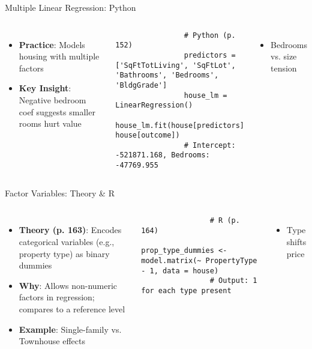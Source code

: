 \documentclass{beamer}
\begin{document}
	\begin{frame}[fragile]{Multiple Linear Regression: Python}
		\lstset{language=Python}
		\begin{columns}
			\begin{itemize}
				\item \textbf{Practice}: Models housing with multiple factors
				\item \textbf{Key Insight}: Negative bedroom coef suggests smaller rooms hurt value
			\end{itemize}
			\begin{lstlisting}
				# Python (p. 152)
				predictors = ['SqFtTotLiving', 'SqFtLot', 'Bathrooms', 'Bedrooms', 'BldgGrade']
				house_lm = LinearRegression()
				house_lm.fit(house[predictors], house[outcome])
				# Intercept: -521871.168, Bedrooms: -47769.955
			\end{lstlisting}
			\begin{itemize}
				\item Bedrooms vs. size tension
			\end{itemize}
		\end{columns}
	\end{frame}
	
	\begin{frame}[fragile]{Factor Variables: Theory \& R}
		\begin{columns}
			\column{0.6\textwidth}
			\begin{itemize}
				\item \textbf{Theory (p. 163)}: Encodes categorical variables (e.g., property type) as binary dummies
				\item \textbf{Why}: Allows non-numeric factors in regression; compares to a reference level
				\item \textbf{Example}: Single-family vs. Townhouse effects
			\end{itemize}
			\begin{lstlisting}
				# R (p. 164)
				prop_type_dummies <- model.matrix(~ PropertyType - 1, data = house)
				# Output: 1 for each type present
			\end{lstlisting}
			\column{0.4\textwidth}
			\begin{itemize}
				\item Type shifts price
			\end{itemize}
		\end{columns}
	\end{frame}
	
\end{document}
